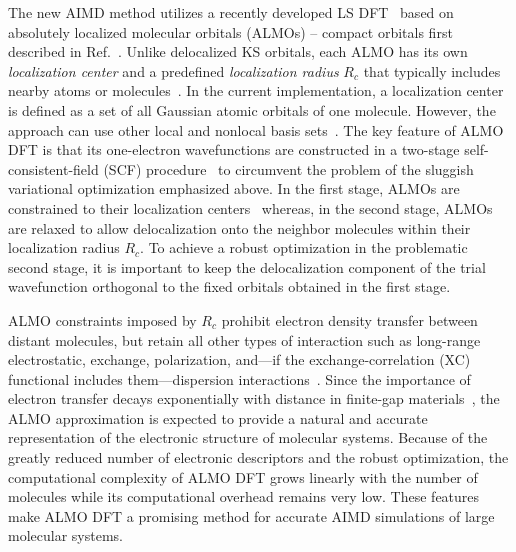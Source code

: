 \documentclass[aip,jcp,reprint,amsmath,amssymb]{revtex4-1}
\begin{document}
The new AIMD method utilizes a recently developed LS DFT~\cite{a:almo-ls} based on absolutely localized molecular orbitals (\mbox{ALMOs}) -- compact orbitals first described in Ref.~. 
Unlike delocalized KS orbitals, each \mbox{ALMO} has its own \emph{localization center} and a predefined \emph{localization radius} $R_{c}$ that typically includes nearby atoms or molecules~\cite{a:stoll,a:almo-ls}. 
In the current implementation, a localization center is defined as a set of all Gaussian atomic orbitals of one molecule. 
However, the approach can use other local and nonlocal basis sets~\cite{a:galli_loc, Lin2012}. 
The key feature of ALMO DFT is that its one-electron wavefunctions are constructed in a two-stage self-consistent-field (SCF) procedure~\cite{a:almo-ls} to circumvent the problem of the sluggish variational optimization emphasized above. 
In the first stage, ALMOs are constrained to their localization centers~\cite{a:khal} whereas, in the second stage, ALMOs are relaxed to allow delocalization onto the neighbor molecules within their localization radius $R_{c}$. 
To achieve a robust optimization in the problematic second stage, it is important to keep the delocalization component of the trial wavefunction orthogonal to the fixed orbitals obtained in the first stage. 

ALMO constraints imposed by $R_c$ prohibit electron density transfer between distant molecules, but retain all other types of interaction such as long-range electrostatic, exchange, polarization, and---if the exchange-correlation (XC) functional includes them---dispersion interactions~\cite{a:theeda}. 
Since the importance of electron transfer decays exponentially with distance in finite-gap materials~\cite{a:ls-rev-1999}, the \mbox{ALMO} approximation is expected to provide a natural and accurate representation of the electronic structure of molecular systems. %
Because of the greatly reduced number of electronic descriptors and the robust optimization, the computational complexity of ALMO DFT grows linearly with the number of molecules while its computational overhead remains very low. These features make ALMO DFT a promising method for accurate AIMD simulations of large molecular systems.
\end{document}
